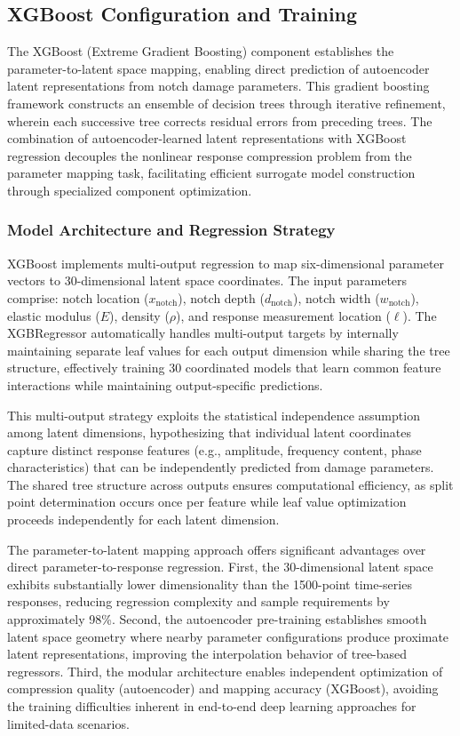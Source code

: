 \documentclass[12pt,a4paper]{report}
\begin{document}
\subsection{XGBoost Configuration and Training}

The XGBoost (Extreme Gradient Boosting) component establishes the parameter-to-latent space mapping, enabling direct prediction of autoencoder latent representations from notch damage parameters. This gradient boosting framework constructs an ensemble of decision trees through iterative refinement, wherein each successive tree corrects residual errors from preceding trees. The combination of autoencoder-learned latent representations with XGBoost regression decouples the nonlinear response compression problem from the parameter mapping task, facilitating efficient surrogate model construction through specialized component optimization.

\subsubsection{Model Architecture and Regression Strategy}

XGBoost implements multi-output regression to map six-dimensional parameter vectors to 30-dimensional latent space coordinates. The input parameters comprise: notch location ($x_{\text{notch}}$), notch depth ($d_{\text{notch}}$), notch width ($w_{\text{notch}}$), elastic modulus ($E$), density ($\rho$), and response measurement location ($\ell$). The XGBRegressor automatically handles multi-output targets by internally maintaining separate leaf values for each output dimension while sharing the tree structure, effectively training 30 coordinated models that learn common feature interactions while maintaining output-specific predictions.

This multi-output strategy exploits the statistical independence assumption among latent dimensions, hypothesizing that individual latent coordinates capture distinct response features (e.g., amplitude, frequency content, phase characteristics) that can be independently predicted from damage parameters. The shared tree structure across outputs ensures computational efficiency, as split point determination occurs once per feature while leaf value optimization proceeds independently for each latent dimension.

The parameter-to-latent mapping approach offers significant advantages over direct parameter-to-response regression. First, the 30-dimensional latent space exhibits substantially lower dimensionality than the 1500-point time-series responses, reducing regression complexity and sample requirements by approximately 98\%. Second, the autoencoder pre-training establishes smooth latent space geometry where nearby parameter configurations produce proximate latent representations, improving the interpolation behavior of tree-based regressors. Third, the modular architecture enables independent optimization of compression quality (autoencoder) and mapping accuracy (XGBoost), avoiding the training difficulties inherent in end-to-end deep learning approaches for limited-data scenarios.
\end{document}
